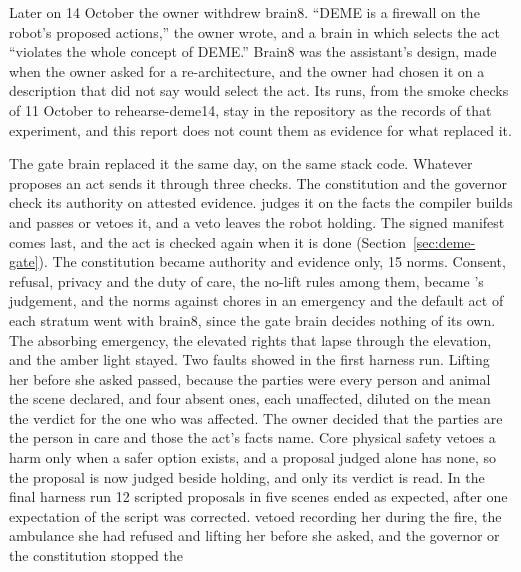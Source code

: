 Later on 14 October the owner withdrew brain8. ``DEME is a firewall on the robot's proposed
actions,'' the owner wrote, and a brain in which \deme{} selects the act ``violates the whole
concept of DEME.'' Brain8 was the assistant's design, made when the owner asked for a
re-architecture, and the owner had chosen it on a description that did not say \deme{} would
select the act. Its runs, from the smoke checks of 11 October to rehearse-deme14, stay in the
repository as the records of that experiment, and this report does not count them as evidence for
what replaced it.

The gate brain replaced it the same day, on the same stack code. Whatever proposes an act sends
it through three checks. The constitution and the governor check its authority on attested
evidence. \deme{} judges it on the facts the compiler builds and passes or vetoes it, and a veto
leaves the robot holding. The signed manifest comes last, and the act is checked again when it is
done (Section~\ref{sec:deme-gate}). The constitution became authority and evidence only, 15 norms.
Consent, refusal, privacy and the duty of care, the no-lift rules among them, became \deme{}'s
judgement, and the norms against chores in an emergency and the default act of each stratum went
with brain8, since the gate brain decides nothing of its own. The absorbing emergency, the
elevated rights that lapse through the elevation, and the amber light stayed.
Two faults showed in the first harness run. Lifting her before she asked passed, because the
parties were every person and animal the scene declared, and four absent ones, each unaffected,
diluted on the mean the verdict for the one who was affected. The owner decided that the parties
are the person in care and those the act's facts name. Core physical safety vetoes a harm only
when a safer option exists, and a proposal judged alone has none, so the proposal is now judged
beside holding, and only its verdict is read.
In the final harness run 12 scripted proposals in five scenes ended as expected, after one
expectation of the script was corrected. \deme{} vetoed recording her during the fire, the ambulance
she had refused and lifting her before she asked, and the governor or the constitution stopped the
